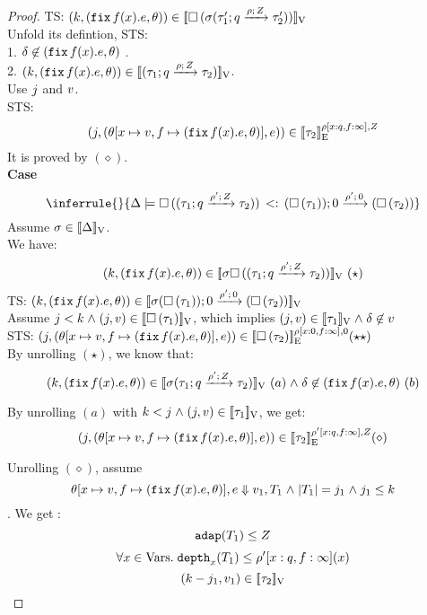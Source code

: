 \begin{proof}
TS: $ (\stepiA, (\efix f(x).\expr, \env) ) \in \lrv{ \tbox{\ienv
    (\tarr{\type_1'}{\type_2'}{\nnatbiA}{\dmap}{\nnatA})  } } $ \\
Unfold its defintion, STS:\\
1. $ \delta \not \in  (\efix f(x).\expr, \env)$ .  \\
2.  $(\stepiA, (\efix f(x).\expr, \env) ) \in  \lrv{(\tarr{\type_1}{\type_2}{\nnatbiA}{\dmap}{\nnatA})}
$. \\
   Use $\stepiB$ and $\valr$.\\
    STS:  \[
   (\stepiB, (\env[x \mapsto \valr, f \mapsto (\efix f(x).\expr, \env)], \expr)) \in \lre{\dmap[x: \nnatbiA, f: \infty]}{\nnatA}{\type_2}
\]
It is proved by $(\diamond)$.
 \\



\textbf{Case}
\[
\inferrule{
    }{
       \Delta \models \sub{\tbox{(
          \tarr{\type_1}{\type_2}{\nnatbiA}{\dmap'}{\nnatA} )} 
      }{\tarr{(\tbox{\type_1}) }{(\tbox{\type_2})}{0}{\dmap'}{0} }
    }
\]
Assume $ \ienv \in \lrv{\Delta}$.\\
We have:  $$ (\stepiA, (\efix f(x).\expr, \env) ) \in \lrv{\ienv \tbox{(
          \tarr{\type_1}{\type_2}{\nnatbiA}{\dmap'}{\nnatA} )} }
      ~(\star)$$
TS: $ (\stepiA, (\efix f(x).\expr, \env) ) \in \lrv{ \ienv 
  \tarr{(\tbox{\type_1}) }{(\tbox{\type_2})}{0}{\dmap'}{0}} $ \\
Assume $\stepiB < \stepiA \conj (j, \valr) \in \lrv{\tbox{\type_1}}$,
which implies $ (j, \valr) \in \lrv{\type_1} \conj \delta \not \in \valr$ \\
STS: $(\stepiB, (\env[x \mapsto \valr, f \mapsto (\efix f(x).\expr,
\env)], \expr)) \in \lre{\dmap[x: 0, f:
  \infty]}{0}{ \tbox{ \type_2} } (\star\star)$\\

By unrolling $(\star)$, we know that: 
 $$ (\stepiA, (\efix f(x).\expr, \env) ) \in \lrv{\ienv (
          \tarr{\type_1}{\type_2}{\nnatbiA}{\dmap'}{\nnatA} ) } ~(a) \conj
        \delta \not \in   (\efix f(x).\expr, \env) ~(b)
      $$

By unrolling $(a)$ with $\stepiA < \stepiB \conj (j, \valr) \in
\lrv{\type_1}$, we get:
 \[
(\stepiB, (\env[x \mapsto \valr, f \mapsto (\efix f(x).\expr,
\env)], \expr)) \in \lre{\dmap'[x: \nnatbiA, f:
  \infty]}{\nnatA}{  \type_2 } (\diamond)
\]

Unrolling $(\diamond)$, assume \[ \env[x \mapsto \valr, f \mapsto (\efix f(x).\expr,
\env)], \expr \bigstep \valr_1, \tr_1 \conj |\tr_1| = \stepiB_1 \conj
\stepiB_1 \leq \stepiA \] .
We get : $$ \adap(\tr_1) \leq \nnatA $$
         $$\forall x \in \mbox{Vars}.\eapp  \ddep{x}(\tr_1) \leq
         \dmap'[x: \nnatbiA, f: \infty](x)$$
         $$  (\stepiA - \stepiB_1,  \valr_1) \in \lrv{\type_2}$$


\end{proof}
